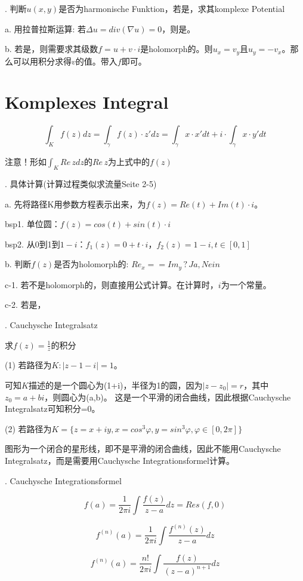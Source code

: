 \documentclass[fleqn]{article}
\begin{document}
. 判断$u(x,y)$是否为harmonische Funktion，若是，求其komplexe Potential

a. 用拉普拉斯运算: 若$\Delta u = div(\nabla u)=0$，则是。

b. 若是，则需要求其级数$f = u + v\cdot i$是holomorph的。则$u_x=v_y$且$u_y=-v_x$。那么可以用积分求得$v$的值。带入$f$即可。

\section{Komplexes Integral}

$$\int_Kf(z)dz=\int_{\gamma}f(z)\cdot z'dz=\int_{\gamma}x\cdot x'dt + i\cdot\int_{\gamma}x\cdot y'dt$$

\noindent 注意！形如$\int_KRe\,zdz$的$Re\,z$为上式中的$f(z)$

. 具体计算(计算过程类似求流量Seite 2-5)

a. 先将路径K用参数方程表示出来，为$f(z)=Re(t)+Im(t)\cdot i$。

\qquad bsp1. 单位圆：$f(z)=cos(t)+sin(t)\cdot i$

\qquad bsp2. 从0到1到$1-i$：$f_1(z)=0+t\cdot i$，$f_2(z)=1-i,t\in[0,1]$

b. 判断$f(z)$是否为holomorph的: $Re_x == Im_y \,?\, Ja, Nein $

c-1. 若不是holomorph的，则直接用公式计算。在计算时，$i$为一个常量。

c-2. 若是，

. Cauchysche Integralsatz

求$f(z)=\frac{1}{z}$的积分

(1) 若路径为$K: |z-1-i|=1$。

可知$K$描述的是一个圆心为(1+i)，半径为1的圆，因为$|z-z_0|=r$，其中$z_0=a+bi$，则圆心为(a,b)。
这是一个平滑的闭合曲线，因此根据Cauchysche Integralsatz可知积分=0。

(2) 若路径为$K=\{z=x+iy,x=cos^3\varphi,y=sin^3\varphi,\varphi\in[0,2\pi]\}$

图形为一个闭合的星形线，即不是平滑的闭合曲线，因此不能用Cauchysche Integralsatz，而是需要用Cauchysche Integrationsformel计算。

. Cauchysche Integrationsformel

$$f(a)=\frac{1}{2\pi i}\int\frac{f(z)}{z-a}dz=Res(f,0)$$

$$f^{(n)}(a)=\frac{1}{2\pi i}\int\frac{f^{(n)}(z)}{z-a}dz$$

$$f^{(n)}(a)=\frac{n!}{2\pi i}\int\frac{f(z)}{(z-a)^{n+1}}dz$$
\end{document}

